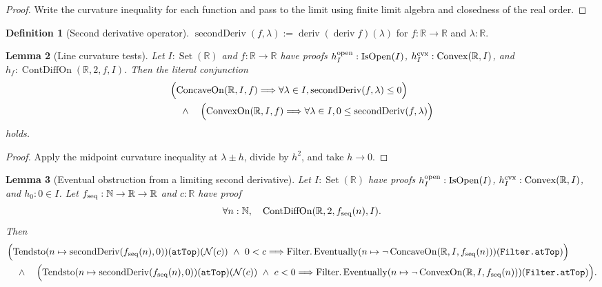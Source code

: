 \documentclass[9pt]{extarticle}
\newtheorem{lemma}{Lemma}[section]
\theoremstyle{definition}
\newtheorem{definition}[lemma]{Definition}
\theoremstyle{remark}
\newcommand{\R}{\mathbb R}
\newcommand{\N}{\mathbb N}
\begin{document}
\begin{proof}
Write the curvature inequality for each function and pass to the limit using
finite limit algebra and closedness of the real order.
\end{proof}

\begin{definition}[Second derivative operator]
\label{def:fnd-second-deriv}
$\operatorname{secondDeriv}(f,\lambda):=
\operatorname{deriv}(\operatorname{deriv}f)(\lambda)$ for
$f:\R\to\R$ and $\lambda:\R$.
\end{definition}

\begin{lemma}[Line curvature tests]
\label{lem:fnd-line-curvature}
Let $I:\operatorname{Set}(\R)$ and $f:\R\to\R$ have proofs
$h_I^{\rm open}:\operatorname{IsOpen}(I)$,
$h_I^{\rm cvx}:\operatorname{Convex}(\R,I)$, and
$h_f:\operatorname{ContDiffOn}(\R,2,f,I)$.
Then the literal conjunction
\begin{align*}
 &\Bigl(\operatorname{ConcaveOn}(\R,I,f)\Longrightarrow
   \forall\lambda\in I,\operatorname{secondDeriv}(f,\lambda)\leq0\Bigr)\\
 &\quad\wedge\quad
 \Bigl(\operatorname{ConvexOn}(\R,I,f)\Longrightarrow
   \forall\lambda\in I,0\leq\operatorname{secondDeriv}(f,\lambda)\Bigr)
\end{align*}
holds.
\end{lemma}

\begin{proof}
Apply the midpoint curvature inequality at $\lambda\pm h$, divide by $h^2$,
and take $h\to0$.
\end{proof}

\begin{lemma}[Eventual obstruction from a limiting second derivative]
\label{lem:fnd-line-curvature-eventual}
Let $I:\operatorname{Set}(\R)$ have proofs
$h_I^{\rm open}:\operatorname{IsOpen}(I)$,
$h_I^{\rm cvx}:\operatorname{Convex}(\R,I)$, and $h_0:0\in I$.  Let
$f_{\rm seq}:\N\to\R\to\R$ and $c:\R$ have proof
\[
 \forall n:\N,\quad
 \operatorname{ContDiffOn}(\R,2,f_{\rm seq}(n),I).
\]
Then
\begin{align*}
 &\Bigl(
  \operatorname{Tendsto}
   (n\mapsto\operatorname{secondDeriv}(f_{\rm seq}(n),0))
   (\texttt{atTop})(\mathcal N(c))\ \wedge\ 0<c
  \Longrightarrow
  \operatorname{Filter.Eventually}
   (n\mapsto\neg\operatorname{ConcaveOn}(\R,I,f_{\rm seq}(n)))
   (\texttt{Filter.atTop})\Bigr)\\
 &\quad\wedge\quad
 \Bigl(
  \operatorname{Tendsto}
   (n\mapsto\operatorname{secondDeriv}(f_{\rm seq}(n),0))
   (\texttt{atTop})(\mathcal N(c))\ \wedge\ c<0
  \Longrightarrow
  \operatorname{Filter.Eventually}
   (n\mapsto\neg\operatorname{ConvexOn}(\R,I,f_{\rm seq}(n)))
   (\texttt{Filter.atTop})\Bigr).
\end{align*}
\end{lemma}
\end{document}
